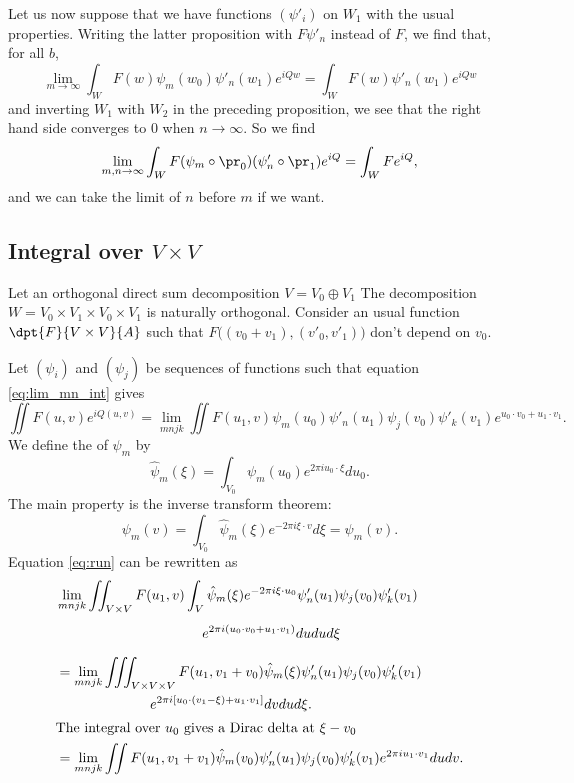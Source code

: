 Let us now suppose that we have functions $(\psi'_i)$ on $W_1$ with the usual properties. Writing the latter proposition with $F\psi'_n$ instead of $F$, we find that, for all $b$, 
\[ 
  \lim_{m\to\infty}\int_WF(w)\psi_m(w_0)\psi'_n(w_1)e^{iQw}=\int_WF(w)\psi'_n(w_1)e^{iQw}
\]
and inverting $W_1$ with $W_2$ in the preceding proposition, we see that the right hand side converges to $0$ when $n\to\infty$. So we find
\begin{equation} \label{eq:lim_mn_int}
  \lim_{m,n\to\infty}\int_WF(\psi_m\circ\pr_0)(\psi'_n\circ\pr_1)e^{iQ}=\int_WFe^{iQ},
\end{equation}
and we can take the limit of $n$ before $m$ if we want.


\subsection{Integral over \texorpdfstring{$V\times V$}{VV}}

Let an orthogonal direct sum decomposition $V=V_0\oplus V_1$ The decomposition $W=V_0\times V_1\times V_0\times V_1$ is naturally orthogonal. Consider an usual function $\dpt{F}{V\times V}{A}$ such that $F\big( (v_0+v_1),(v'_0,v'_1) \big)$ don't depend on $v_0$.

Let $(\psi_i)$ and $(\psi_j)$ be sequences of functions such that equation \eqref{eq:lim_mn_int} gives
\begin{equation} \label{eq:run}
  \iint F(u,v)e^{iQ(u,v)}=\lim_{mnjk}\iint F(u_1,v)\psi_m(u_0)\psi'_n(u_1)\psi_j(v_0)\psi'_k(v_1)e^{u_0\cdot v_0+u_1\cdot v_1}.
\end{equation}
We define the  of $\psi_m$ by
\[ 
   \hat\psi_m(\xi)=\int_{V_0}\psi_m(u_0)e^{2\pi i u_0\cdot\xi}du_0. 
\]
The main property is the inverse transform theorem:
\[ 
  \psi_m(v)=\int_{V_0}\hat\psi_m(\xi)e^{-2\pi i\xi\cdot v}d\xi=\psi_m(v).
\]
%
Equation \eqref{eq:run} can be rewritten as
\newcommand{\pheqrdeuxun}{\lim_{mnjk}\iint_{V\times V}F(u_1,v)\int_V} 
\newcommand{\pheqrdeuxdeux}{\lim_{mnjk}\iiint_{V\times V\times V}F(u_1,v_1+v_0)} 
\begin{equation} \label{eq:rdeux}
\begin{split}
  &\pheqrdeuxun\hat\psi_m(\xi)e^{-2\pi i\xi\cdot u_0}\psi'_n(u_1)\psi_j(v_0)\psi'_k(v_1)\\
&\phantom{\pheqrdeuxun}e^{2\pi i(u_0\cdot v_0+u_1\cdot v_1)}dudud\xi\\
   &=\pheqrdeuxdeux\hat\psi_m(\xi)\psi'_n(u_1)\psi_j(v_0)\psi'_k(v_1)\\
	&\phantom{pheqrdeuxdeux}e^{2\pi i[u_0\cdot(v_1-\xi)+u_1\cdot v_1]}dvdud\xi.\\
\intertext{The integral over $u_0$ gives a Dirac delta at $\xi-v_0$}
 &=\lim_{mnjk}\iint F(u_1,v_1+v_1)\hat\psi_m(v_0)\psi'_n(u_1)\psi_j(v_0)\psi'_k(v_1)e^{2\pi i u_1\cdot v_1}dudv.
\end{split}
\end{equation}

